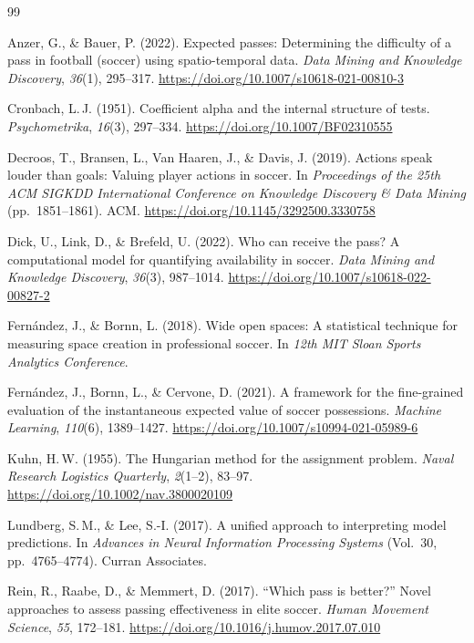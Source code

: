 \documentclass[12pt,a4paper]{article}
\begin{document}
\clearpage
\begin{thebibliography}{99}
\sloppy

Anzer, G., \& Bauer, P. (2022).
Expected passes: Determining the difficulty of a pass in football (soccer) using spatio-temporal data.
\emph{Data Mining and Knowledge Discovery}, \emph{36}(1), 295--317.
\url{https://doi.org/10.1007/s10618-021-00810-3}

Cronbach, L.\,J. (1951).
Coefficient alpha and the internal structure of tests.
\emph{Psychometrika}, \emph{16}(3), 297--334.
\url{https://doi.org/10.1007/BF02310555}

Decroos, T., Bransen, L., Van Haaren, J., \& Davis, J. (2019).
Actions speak louder than goals: Valuing player actions in soccer.
In \emph{Proceedings of the 25th ACM SIGKDD International Conference on Knowledge Discovery \& Data Mining} (pp.\ 1851--1861). ACM.
\url{https://doi.org/10.1145/3292500.3330758}

Dick, U., Link, D., \& Brefeld, U. (2022).
Who can receive the pass? A computational model for quantifying availability in soccer.
\emph{Data Mining and Knowledge Discovery}, \emph{36}(3), 987--1014.
\url{https://doi.org/10.1007/s10618-022-00827-2}

Fern\'{a}ndez, J., \& Bornn, L. (2018).
Wide open spaces: A statistical technique for measuring space creation in professional soccer.
In \emph{12th MIT Sloan Sports Analytics Conference}.

Fern\'{a}ndez, J., Bornn, L., \& Cervone, D. (2021).
A framework for the fine-grained evaluation of the instantaneous expected value of soccer possessions.
\emph{Machine Learning}, \emph{110}(6), 1389--1427.
\url{https://doi.org/10.1007/s10994-021-05989-6}

Kuhn, H.\,W. (1955).
The Hungarian method for the assignment problem.
\emph{Naval Research Logistics Quarterly}, \emph{2}(1--2), 83--97.
\url{https://doi.org/10.1002/nav.3800020109}

Lundberg, S.\,M., \& Lee, S.-I. (2017).
A unified approach to interpreting model predictions.
In \emph{Advances in Neural Information Processing Systems} (Vol.\ 30, pp.\ 4765--4774). Curran Associates.

Rein, R., Raabe, D., \& Memmert, D. (2017).
``Which pass is better?'' Novel approaches to assess passing effectiveness in elite soccer.
\emph{Human Movement Science}, \emph{55}, 172--181.
\url{https://doi.org/10.1016/j.humov.2017.07.010}


\end{thebibliography}
\end{document}
